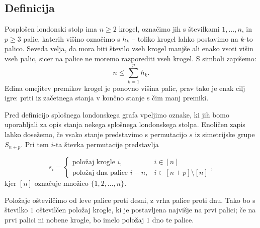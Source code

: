 \documentclass[twoside,11pt]{article}
\begin{document}
\subsection{Definicija}

Posplošen londonski stolp ima $n \geq 2$ krogel, označimo jih s številkami $1,\ldots,n$, in $p \geq 3$ palic, katerih višino označimo s $h_k$ -- toliko krogel lahko postavimo na $k$-to palico. Seveda velja, da mora biti število vseh krogel manjše ali enako vsoti višin vseh palic, sicer na palice ne moremo razporediti vseh krogel. S simboli zapišemo:
\[ n \leq \sum_{k=1}^{p} h_k.\]
Edina omejitev premikov krogel je ponovno višina palic, prav tako je enak cilj igre: priti iz začetnega stanja v končno stanje s čim manj premiki.

Pred definicijo splošnega londonskega grafa vpeljimo oznake, ki jih bomo uporabljali za opis stanja nekega splošnega londonskega stolpa. Enoličen zapis lahko dosežemo, če vsako stanje predstavimo s permutacijo $s$ iz simetrijske grupe $S_{n+p}$. Pri tem $i$-ta števka permutacije predstavlja

\[ s_i =
\begin{cases}
\text{položaj krogle } i, & i \in [n] \\
\text{položaj dna palice } i-n, & i \in [n+p] \setminus [n]
\end{cases},
\]
kjer $[n]$ označuje množico $\{1,2,\ldots, n \}$.

Položaje oštevilčimo od leve palice proti desni, z vrha palice proti dnu. Tako bo s številko $1$ oštevilčen položaj krogle, ki je postavljena najvišje na prvi palici; če na prvi palici ni nobene krogle, bo imelo položaj $1$ dno te palice.
\end{document}
